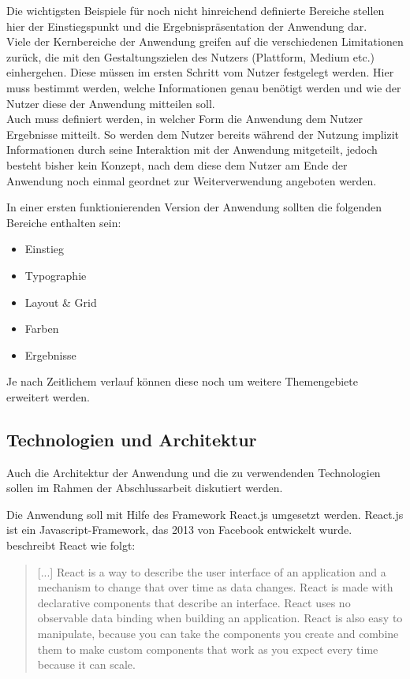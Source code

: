 Die wichtigsten Beispiele für noch nicht hinreichend definierte Bereiche stellen hier der Einstiegspunkt und die Ergebnispräsentation der Anwendung dar.\\
Viele der Kernbereiche der Anwendung greifen auf die verschiedenen Limitationen zurück, die mit den Gestaltungszielen des Nutzers (Plattform, Medium etc.) einhergehen. Diese müssen im ersten Schritt vom Nutzer festgelegt werden. Hier muss bestimmt werden, welche Informationen genau benötigt werden und wie der Nutzer diese der Anwendung mitteilen soll.\\
Auch muss definiert werden, in welcher Form die Anwendung dem Nutzer Ergebnisse mitteilt. So werden dem Nutzer bereits während der Nutzung implizit Informationen durch seine Interaktion mit der Anwendung mitgeteilt, jedoch besteht bisher kein Konzept, nach dem diese dem Nutzer am Ende der Anwendung noch einmal geordnet zur Weiterverwendung angeboten werden.

In einer ersten funktionierenden Version der Anwendung sollten die folgenden Bereiche enthalten sein:

\begin{itemize}
  \item Einstieg
  \item Typographie
  \item Layout \& Grid
  \item Farben
  \item Ergebnisse
\end{itemize}

Je nach Zeitlichem verlauf können diese noch um weitere Themengebiete erweitert werden.

\subsection{Technologien und Architektur}
Auch die Architektur der Anwendung und die zu verwendenden Technologien sollen im Rahmen der Abschlussarbeit diskutiert werden.

Die Anwendung soll mit Hilfe des Framework React.js umgesetzt werden. React.js ist ein Javascript-Framework, das 2013 von Facebook entwickelt wurde. \cite{gackenheimer2015react} beschreibt React wie folgt:

\begin{quote}
[...] React is a way to describe the user interface of an application and a mechanism to change that over time as data changes. React is made with declarative components that describe an interface. React uses no observable data binding when building an application. React is also easy to manipulate, because you can take the components you create and combine them to make custom components that work as you expect every time because it can scale.
\end{quote}

